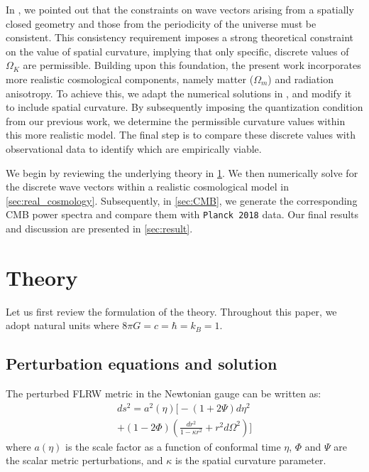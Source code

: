 \documentclass[%
 reprint,
 amsmath,amssymb,
 prd, %
]{revtex4-2}
\begin{document}
In \cite{PhysRevD.110.103528}, we pointed out that the constraints on wave vectors arising from a spatially closed geometry and those from the periodicity of the universe must be consistent. This consistency requirement imposes a strong theoretical constraint on the value of spatial curvature, implying that only specific, discrete values of $\Omega_K$ are permissible. Building upon this foundation, the present work incorporates more realistic cosmological components, namely matter ($\Omega_m$) and radiation anisotropy. To achieve this, we adapt the numerical solutions in \cite{2022PhRvD.105l3508P}, and modify it to include spatial curvature. By subsequently imposing the quantization condition from our previous work, we determine the permissible curvature values within this more realistic model. The final step is to compare these discrete values with observational data to identify which are empirically viable.


We begin by reviewing the underlying theory in \cref{sec:theory}. We then numerically solve for the discrete wave vectors within a realistic cosmological model in \cref{sec:real_cosmology}. Subsequently, in \cref{sec:CMB}, we generate the corresponding CMB power spectra and compare them with \texttt{Planck 2018} data. Our final results and discussion are presented in \cref{sec:result}. %

\section{Theory}\label{sec:theory}

Let us first review the formulation of the theory. Throughout this paper, we adopt natural units where $8\pi G=c=\hbar=k_B=1$. 

\subsection{Perturbation equations and solution} %

The perturbed FLRW metric in the Newtonian gauge can be written as: %
\begin{multline}
    \label{eq:metric}
    ds^2 = a^2(\eta)\bigl[-(1 + 2\Psi)d\eta^2 \\
    + (1 - 2\Phi)\left(\frac{dr^2}{1-\kappa r^2}+r^2d\Omega^2\right)\bigr]
\end{multline}
where $a(\eta)$ is the scale factor as a function of conformal time $\eta$, $\Phi$ and $\Psi$ are the scalar metric perturbations, and $\kappa$ is the spatial curvature parameter.  %
\end{document}

